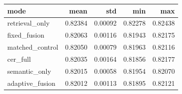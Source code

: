 \begin{tabular}{lrrrr}
\toprule
mode & mean & std & min & max \\
\midrule
retrieval_only & 0.82384 & 0.00092 & 0.82278 & 0.82438 \\
fixed_fusion & 0.82063 & 0.00116 & 0.81943 & 0.82175 \\
matched_control & 0.82050 & 0.00079 & 0.81963 & 0.82116 \\
cer_full & 0.82035 & 0.00164 & 0.81856 & 0.82177 \\
semantic_only & 0.82015 & 0.00058 & 0.81954 & 0.82070 \\
adaptive_fusion & 0.82012 & 0.00113 & 0.81895 & 0.82121 \\
\bottomrule
\end{tabular}

